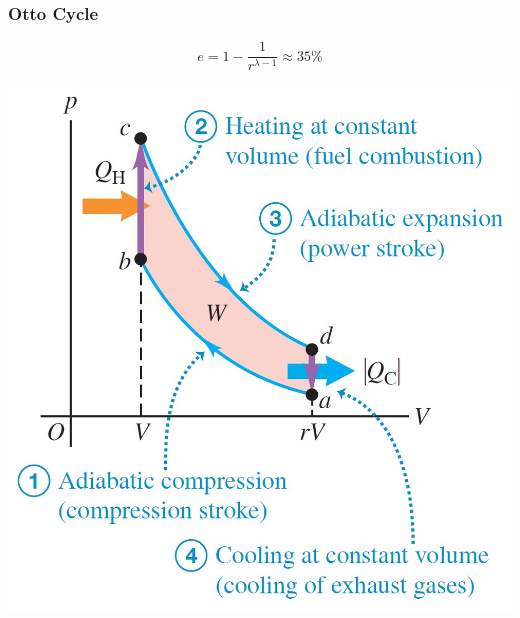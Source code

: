 \documentclass{article}
\begin{document}
\subsubsection{Otto Cycle}
\[e=1-\frac{1}{r^{\lambda-1}}\approx 35\%\]
\begin{center}
    \includegraphics[scale=0.23]{images/otto_cycle.jpg}
\end{center}
\end{document}
